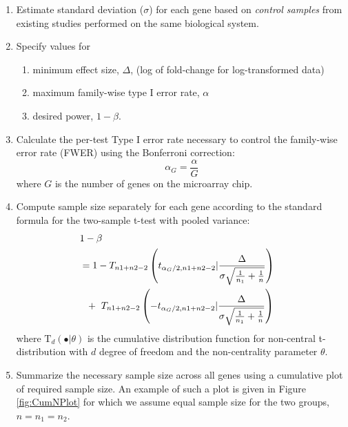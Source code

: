 \documentclass{bioinfo}
\begin{document}
\begin{enumerate}
\item{Estimate standard deviation ($\sigma$) for each gene based on
    \emph{control samples} from existing studies performed on the
    same biological system.}

\item{Specify values for
    \begin{enumerate}
    \item minimum effect size, $\Delta$, (log of fold-change for log-transformed data)
    \item maximum family-wise type I error rate, $\alpha$
    \item desired power, $1 - \beta$.
    \end{enumerate}
  }

\item{Calculate the per-test Type I error rate necessary to control
    the family-wise error rate (FWER) using the Bonferroni correction:}
\begin{equation}
  \alpha_G = \frac{\alpha}{G}
\end{equation}
%
where $G$ is the number of genes on the microarray chip.

\item{Compute sample size separately for each gene according to the
    standard formula for the two-sample t-test with pooled variance:}
  \begin{eqnarray}
    \lefteqn{1-\beta} \nonumber \\
    &= 1-T_{n1+n2-2} \left( t_{\alpha_G/2,n1+n2-2} | \frac{\Delta}{\sigma \sqrt{\frac{1}{n_1} + \frac{1}{n}}}\right) \nonumber \\
    &  ~~+~T_{n1+n2-2} \left( -t_{\alpha_G/2,n1+n2-2} | \frac{\Delta}{\sigma \sqrt{\frac{1}{n_1} + \frac{1}{n}}}\right)
    \label{eq:formula}
  \end{eqnarray}
  where $\mathrm{T}_{d}(\bullet|\theta)$ is the cumulative
  distribution function for non-central t-distribution with $d$ degree
  of freedom and the non-centrality parameter $\theta$.

\item{Summarize the necessary sample size across all genes using a
      cumulative plot of required sample size. An example of such a
      plot is given in Figure \ref{fig:CumNPlot} for which we assume equal sample size for the two groups, $n = n_1 = n_2$.}

\end{enumerate}
\end{document}
